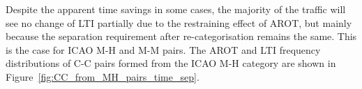 Despite the apparent time savings in some cases, the majority of the traffic will see no change of LTI partially due to the restraining effect of AROT, but mainly because the separation requirement after re-categorisation remains the same. This is the case for ICAO M-H and M-M pairs.
The AROT and LTI frequency distributions of C-C pairs formed from the ICAO M-H category are shown in Figure~\ref{fig:CC_from_MH_pairs_time_sep}. 
\begin{figure}[h]
    \centering
    
    

\end{figure}
